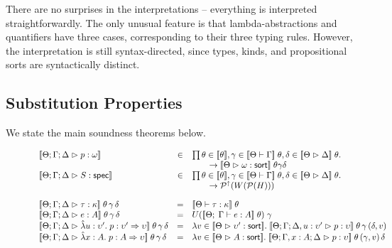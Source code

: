 There are no surprises in the interpretations -- everything is
interpreted straightforwardly. The only unusual feature is that
lambda-abstractions and quantifiers have three cases, corresponding to
their three typing rules. However, the interpretation is still
syntax-directed, since types, kinds, and propositional sorts are
syntactically distinct.

\subsection{Substitution Properties}

We state the main soundness theorems below. 

\begin{figure}
\begin{displaymath}
\begin{array}{lcl}
\interp{\judgeA{p}{\omega}} & \in & \prod \theta \in \interp{\theta}, \gamma \in \interp{\judgectx{\Theta}{\Gamma}}\;\theta, \delta \in \interp{\judgeACtx{\Delta}}\;\theta.\\
                            &     & \qquad \to \interp{\judgeSort{\omega}}\;\theta \gamma \delta \\
\interp{\judgeS{S}}         & \in & \prod \theta \in \interp{\theta}, \gamma \in \interp{\judgectx{\Theta}{\Gamma}}\;\theta, \delta \in \interp{\judgeACtx{\Delta}}\;\theta.\\
                            &     &\qquad\to \upset{W(\powerset{H})} \\[1em]

\interp{\judgeA{\tau}{\kappa}}\;\theta\,\gamma\,\delta & = & \interp{\judgeWK{\tau}{\kappa}}\;\theta \\

\interp{\judgeA{e}{A}}\;\theta\,\gamma\,\delta & = &  U(\interp{\judgeE{\Gamma}{e}{A}}\;\theta)\;\gamma \\

\interp{\judgeA{\pfun{u}{\upsilon'}{p}}{\upsilon' \To \upsilon}}\;\theta\,\gamma\,\delta & = & 
   \semfun{v \in \interp{\judgeSort{\upsilon'}}}
          {\interp{\judgeA[\Theta; \Gamma; \Delta,u:\upsilon']{p}{\upsilon}}\;\theta\,\gamma\,(\delta, v)} \\

\interp{\judgeA{\pfun{x}{A}{p}}{A \To \upsilon}}\;\theta\,\gamma\,\delta & = & 
   \semfun{v \in \interp{\judgeSort{A}}}
          {\interp{\judgeA[\Theta;\Gamma,x:A;\Delta]{p}{\upsilon}}\;\theta\,(\gamma,v)\,\delta} \\


\end{array}
\end{displaymath}
\end{figure}
